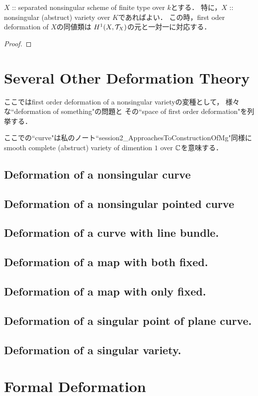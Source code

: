\documentclass[a4paper]{jsarticle}
\begin{document}
    \begin{Thm}
        $X$ :: separated nonsingular scheme of finite type over $k$とする．
        特に，$X$ :: nonsingular (abstruct) variety over $K$であればよい．
        この時，first oder deformation of $X$の同値類は
        $H^1(X, \mathcal{T}_X)$の元と一対一に対応する．
    \end{Thm}
    \begin{proof}
        
    \end{proof}

\section{Several Other Deformation Theory}
    ここではfirst order deformation of a nonsingular varietyの変種として，
    様々な``deformation of something"の問題と
    その``space of first order deformation"を列挙する．

    ここでの``curve"は私のノート``session2\_ApproachesToConstructionOfMg"同様に
    smooth complete (abstruct) variety of dimention $1$ over $\mathbb{C}$を意味する．

    \subsection{Deformation of a nonsingular curve}
    \subsection{Deformation of a nonsingular pointed curve}
    \subsection{Deformation of a curve with line bundle.}
    \subsection{Deformation of a map  with  both fixed.}
    \subsection{Deformation of a map  with only  fixed.}
    \subsection{Deformation of a singular point of plane curve.}
    \subsection{Deformation of a singular variety.}

\section{Formal Deformation}
    \begin{Def}
        
    \end{Def}




\end{document}
